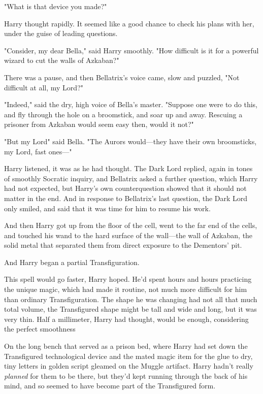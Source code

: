 "What is that device you made?"

Harry thought rapidly. It seemed like a good chance to check his plans with
her, under the guise of leading questions.

"Consider, my dear Bella," said Harry smoothly. "How difficult is it for a
powerful wizard to cut the walls of Azkaban?"

There was a pause, and then Bellatrix's voice came, slow and puzzled, "Not
difficult at all, my Lord{\el}?"

"Indeed," said the dry, high voice of Bella's master. "Suppose one were to do
this, and fly through the hole on a broomstick, and soar up and away. Rescuing
a prisoner from Azkaban would seem easy then, would it not?"

"But my Lord{\el}" said Bella. "The Aurors would---they have their own
broomsticks, my Lord, fast ones\mbox{---}"

Harry listened, it was as he had thought. The Dark Lord replied, again in tones
of smoothly Socratic inquiry, and Bellatrix asked a further question, which
Harry had not expected, but Harry's own counterquestion showed that it should
not matter in the end. And in response to Bellatrix's last question, the Dark
Lord only smiled, and said that it was time for him to resume his work.

And then Harry got up from the floor of the cell, went to the far end of the
cells, and touched his wand to the hard surface of the wall---the wall of
Azkaban, the solid metal that separated them from direct exposure to the
Dementors' pit.

And Harry began a partial Transfiguration.

This spell would go faster, Harry hoped. He'd spent hours and hours practicing
the unique magic, which had made it routine, not much more difficult for him
than ordinary Transfiguration. The shape he was changing had not all that much
total volume, the Transfigured shape might be tall and wide and long, but it
was very thin. Half a millimeter, Harry had thought, would be enough,
considering the perfect smoothness{\el}

On the long bench that served as a prison bed, where Harry had set down the
Transfigured technological device and the mated magic item for the glue to dry,
tiny letters in golden script gleamed on the Muggle artifact. Harry hadn't
really \emph{planned} for them to be there, but they'd kept running through the
back of his mind, and so seemed to have become part of the Transfigured form.

